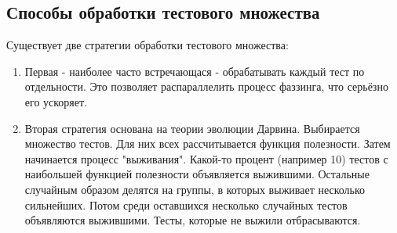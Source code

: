 \documentclass[a4paper]{article}
\begin{document}
\subsection{Способы обработки тестового множества}
\indent

Существует две стратегии обработки тестового множества:

\begin{enumerate}
\item Первая - наиболее часто встречающася - обрабатывать каждый тест по отдельности. Это позволяет распараллелить процесс фаззинга, что серьёзно его ускоряет. 
\item Вторая стратегия основана на теории эволюции Дарвина. Выбирается множество тестов. Для них всех рассчитывается функция полезности. Затем начинается процесс "выживания". Какой-то процент (например 10) тестов с наибольшей функцией полезности объявляется выжившими. Остальные случайным образом делятся на группы, в которых выживает несколько сильнейших. Потом среди оставшихся несколько случайных тестов объявляются выжившими. Тесты, которые не выжили отбрасываются.
\end{enumerate}
\end{document}
